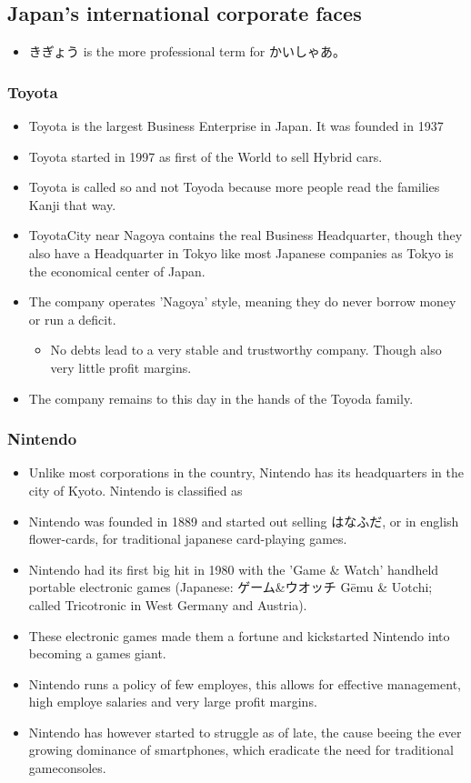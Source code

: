 \documentclass{article}
\newcommand\tabni[1][0.2cm]{\hspace*{#1}}
\begin{document}
\subsection{Japan's international corporate faces}
\begin{itemize}
\item きぎょう is the more professional term for かいしゃあ。
\end{itemize}
\subsubsection{ \tabni Toyota}
\begin{itemize}
\item Toyota is the largest Business Enterprise in Japan. It was founded in 1937
\item Toyota started in 1997 as first of the World to sell Hybrid cars.
\item Toyota is called so and not Toyoda because more people read the families Kanji that way.
\item ToyotaCity near Nagoya contains the real Business Headquarter, though they also have a Headquarter in Tokyo like most Japanese companies as Tokyo is the economical center of Japan.
\item The company operates 'Nagoya' style, meaning they do never borrow money or run a deficit.
\begin{itemize}
\item No debts lead to a very stable and trustworthy company. Though also very little profit margins.
\end{itemize}
\item The company remains to this day in the hands of the Toyoda family.
\end{itemize}
\subsubsection{ \tabni Nintendo}
\begin{itemize}
\item Unlike most corporations in the country, Nintendo has its headquarters in the city of Kyoto. Nintendo is classified as 
\item Nintendo was founded in 1889 and started out selling はなふだ, or in english flower-cards, for traditional japanese card-playing games.
\item Nintendo had its first big hit in 1980 with the 'Game \& Watch' handheld portable electronic games (Japanese: ゲーム\&ウオッチ Gēmu \& Uotchi; called Tricotronic in West Germany and Austria). 
\item These electronic games made them a fortune and kickstarted Nintendo into becoming a games giant.
\item Nintendo runs a policy of few employes, this allows for effective management, high employe salaries and very large profit margins.
\item Nintendo has however started to struggle as of late, the cause beeing the ever growing dominance of smartphones, which eradicate the need for traditional gameconsoles.
\end{itemize}
\end{document}

